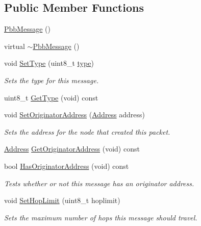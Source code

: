 \subsection*{Public Member Functions}
\begin{DoxyCompactItemize}
\item 
\hyperlink{classns3_1_1PbbMessage_af679b84a45e7a12c956adfb45475d628}{Pbb\+Message} ()
\item 
virtual \hyperlink{classns3_1_1PbbMessage_a99015fd438754fa9deb2963cd42b65d4}{$\sim$\+Pbb\+Message} ()
\item 
void \hyperlink{classns3_1_1PbbMessage_a4b3d1eaabd3e7412a46ac79bf3360dac}{Set\+Type} (uint8\+\_\+t \hyperlink{visualizer-ideas_8txt_add98db9e15e2a58cf2b57623e7aa893a}{type})
\begin{DoxyCompactList}\small\item\em Sets the type for this message. \end{DoxyCompactList}\item 
uint8\+\_\+t \hyperlink{classns3_1_1PbbMessage_ad720b67118bbe16669019b7344903cd9}{Get\+Type} (void) const 
\item 
void \hyperlink{classns3_1_1PbbMessage_a52ac135a2bec53db5e8f46b8b8a25e7c}{Set\+Originator\+Address} (\hyperlink{classns3_1_1Address}{Address} address)
\begin{DoxyCompactList}\small\item\em Sets the address for the node that created this packet. \end{DoxyCompactList}\item 
\hyperlink{classns3_1_1Address}{Address} \hyperlink{classns3_1_1PbbMessage_a28eaf6a89ecf70e54ecf4ae11971f074}{Get\+Originator\+Address} (void) const 
\item 
bool \hyperlink{classns3_1_1PbbMessage_a7d64dd0abb8306bb13cb6f1124f35c3c}{Has\+Originator\+Address} (void) const 
\begin{DoxyCompactList}\small\item\em Tests whether or not this message has an originator address. \end{DoxyCompactList}\item 
void \hyperlink{classns3_1_1PbbMessage_a532a7e5e135f7491f8a84ab1dfadd28f}{Set\+Hop\+Limit} (uint8\+\_\+t hoplimit)
\begin{DoxyCompactList}\small\item\em Sets the maximum number of hops this message should travel. \end{DoxyCompactList}\item 

\end{DoxyCompactItemize}
